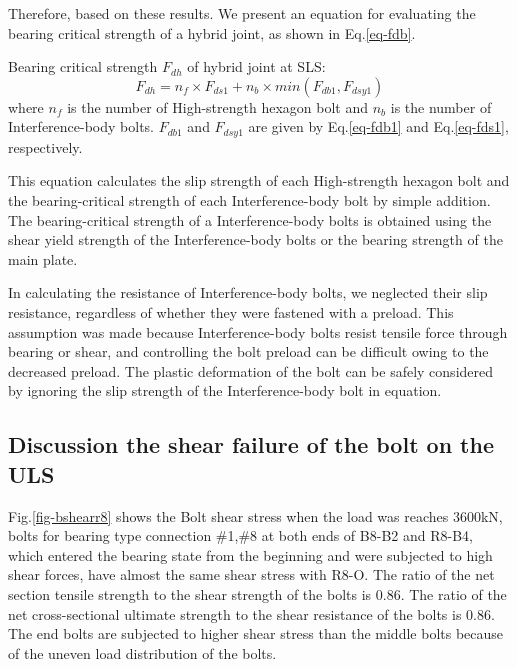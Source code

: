 Therefore, based on these results. We present an equation for evaluating the bearing critical strength of a hybrid joint, as shown in Eq.\ref{eq-fdb}. 

\noindent Bearing critical strength $F_{dh}$ of hybrid joint at SLS:
\begin{equation}
    \label{eq-fdb}
    F_{dh}= n_f \times F_{ds1} + n_b\times min(F_{db1}, F_{dsy1})
\end{equation}
where $n_{f}$ is the number of High-strength hexagon bolt and $n_b$ is the number of Interference-body bolts. $F_{db1}$ and $F_{dsy1}$ are given by Eq.\ref{eq-fdb1} and Eq.\ref{eq-fds1}, respectively.

This equation calculates the slip strength of each High-strength hexagon bolt and the bearing-critical strength of each Interference-body bolt by simple addition. The bearing-critical strength of a Interference-body bolts is obtained using the shear yield strength of the Interference-body bolts or the bearing strength of the main plate.

In calculating the resistance of Interference-body bolts, we neglected their slip resistance, regardless of whether they were fastened with a preload. This assumption was made because Interference-body bolts resist tensile force through bearing or shear, and controlling the bolt preload can be difficult owing to the decreased preload. The plastic deformation of the bolt can be safely considered by ignoring the slip strength of the Interference-body bolt in equation.


\subsection{Discussion the shear failure of the bolt on the ULS}

Fig.\ref{fig-bshearr8} shows the Bolt shear stress when the load was reaches 3600kN, bolts for bearing type connection \#1,\#8 at both ends of B8-B2 and R8-B4, which entered the bearing state from the beginning and were subjected to high shear forces, have almost the same shear stress with R8-O. The ratio of the net section tensile strength to the shear strength of the bolts is 0.86. The ratio of the net cross-sectional ultimate strength to the shear resistance of the bolts is 0.86. The end bolts are subjected to higher shear stress than the middle bolts because of the uneven load distribution of the bolts. 

